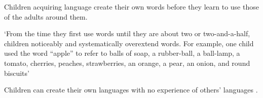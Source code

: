 \documentclass[12pt]{extarticle}
\begin{document}
\begin{multicols}{3}
Children acquiring language create their own words before they learn to use those of the adults
around them.

‘From the time they first use words until they are about two or two-and-a-half,
children noticeably and systematically overextend words. For example, one child used
the word “apple” to refer to balls of soap, a rubber-ball, a ball-lamp, a tomato,
cherries, peaches, strawberries, an orange, a pear, an onion, and round biscuits’
\citep[p.\ 35]{Clark:1993bv}

Children can create their own languages
with no experience of others' languages
\citep{Kegl:1999es,Senghas:2001zm,Goldin-Meadow:2003pj}.





\footnotesize


\end{multicols}
\end{document}

